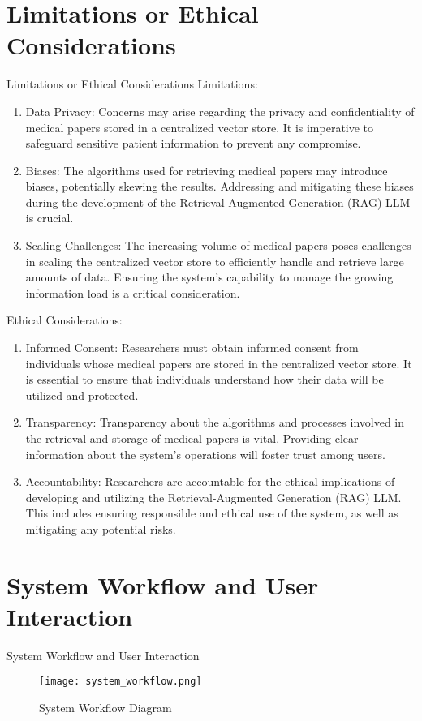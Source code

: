 \documentclass{beamer}
\begin{document}
\section{Limitations or Ethical Considerations}
\begin{frame}{Limitations or Ethical Considerations}
Limitations:
\begin{enumerate}
    \item Data Privacy: Concerns may arise regarding the privacy and confidentiality of medical papers stored in a centralized vector store. It is imperative to safeguard sensitive patient information to prevent any compromise.
    \item Biases: The algorithms used for retrieving medical papers may introduce biases, potentially skewing the results. Addressing and mitigating these biases during the development of the Retrieval-Augmented Generation (RAG) LLM is crucial.
    \item Scaling Challenges: The increasing volume of medical papers poses challenges in scaling the centralized vector store to efficiently handle and retrieve large amounts of data. Ensuring the system's capability to manage the growing information load is a critical consideration.
\end{enumerate}

Ethical Considerations:
\begin{enumerate}
    \item Informed Consent: Researchers must obtain informed consent from individuals whose medical papers are stored in the centralized vector store. It is essential to ensure that individuals understand how their data will be utilized and protected.
    \item Transparency: Transparency about the algorithms and processes involved in the retrieval and storage of medical papers is vital. Providing clear information about the system's operations will foster trust among users.
    \item Accountability: Researchers are accountable for the ethical implications of developing and utilizing the Retrieval-Augmented Generation (RAG) LLM. This includes ensuring responsible and ethical use of the system, as well as mitigating any potential risks.
\end{enumerate}
\end{frame}

\section{System Workflow and User Interaction}
\begin{frame}{System Workflow and User Interaction}
\begin{figure}
\texttt{[image: system\_workflow.png]}
\caption{System Workflow Diagram}
\end{figure}
\end{frame}
\end{document}
